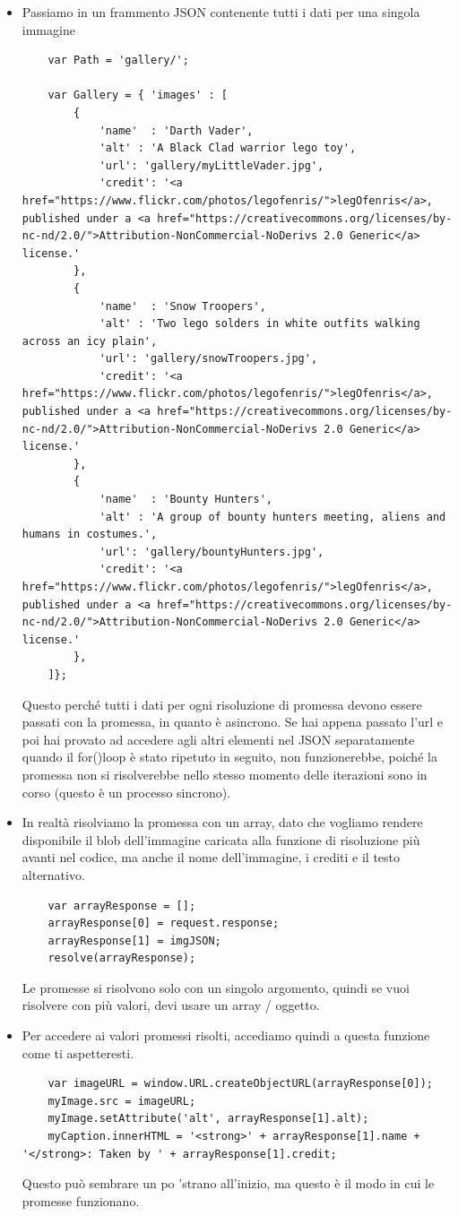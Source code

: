 \documentclass[italian]{article}
\begin{document}
\begin{itemize}
\item Passiamo in un frammento JSON contenente tutti i dati per una singola immagine
\begin{lstlisting}
	var Path = 'gallery/';
	
	var Gallery = { 'images' : [	
		{
			'name'  : 'Darth Vader',
			'alt' : 'A Black Clad warrior lego toy',
			'url': 'gallery/myLittleVader.jpg',
			'credit': '<a href="https://www.flickr.com/photos/legofenris/">legOfenris</a>, published under a <a href="https://creativecommons.org/licenses/by-nc-nd/2.0/">Attribution-NonCommercial-NoDerivs 2.0 Generic</a> license.'
		},	
		{
			'name'  : 'Snow Troopers',
			'alt' : 'Two lego solders in white outfits walking across an icy plain',
			'url': 'gallery/snowTroopers.jpg',
			'credit': '<a href="https://www.flickr.com/photos/legofenris/">legOfenris</a>, published under a <a href="https://creativecommons.org/licenses/by-nc-nd/2.0/">Attribution-NonCommercial-NoDerivs 2.0 Generic</a> license.'
		},	
		{
			'name'  : 'Bounty Hunters',
			'alt' : 'A group of bounty hunters meeting, aliens and humans in costumes.',
			'url': 'gallery/bountyHunters.jpg',
			'credit': '<a href="https://www.flickr.com/photos/legofenris/">legOfenris</a>, published under a <a href="https://creativecommons.org/licenses/by-nc-nd/2.0/">Attribution-NonCommercial-NoDerivs 2.0 Generic</a> license.'
		},
	]};
\end{lstlisting}
Questo perché tutti i dati per ogni risoluzione di promessa devono essere passati con la promessa, in quanto è asincrono. Se hai appena passato l'url e poi hai provato ad accedere agli altri elementi nel JSON separatamente quando il for()loop è stato ripetuto in seguito, non funzionerebbe, poiché la promessa non si risolverebbe nello stesso momento delle iterazioni sono in corso (questo è un processo sincrono).
\item In realtà risolviamo la promessa con un array, dato che vogliamo rendere disponibile il blob dell'immagine caricata alla funzione di risoluzione più avanti nel codice, ma anche il nome dell'immagine, i crediti e il testo alternativo. 

\begin{lstlisting}
	var arrayResponse = [];
	arrayResponse[0] = request.response;
	arrayResponse[1] = imgJSON;
	resolve(arrayResponse);
\end{lstlisting}
Le promesse si risolvono solo con un singolo argomento, quindi se vuoi risolvere con più valori, devi usare un array / oggetto.
\item Per accedere ai valori promessi risolti, accediamo quindi a questa funzione come ti aspetteresti. 
\begin{lstlisting}
	var imageURL = window.URL.createObjectURL(arrayResponse[0]);	
	myImage.src = imageURL;
	myImage.setAttribute('alt', arrayResponse[1].alt);
	myCaption.innerHTML = '<strong>' + arrayResponse[1].name + '</strong>: Taken by ' + arrayResponse[1].credit;
\end{lstlisting}
Questo può sembrare un po 'strano all'inizio, ma questo è il modo in cui le promesse funzionano.
\end{itemize}
\end{document}
